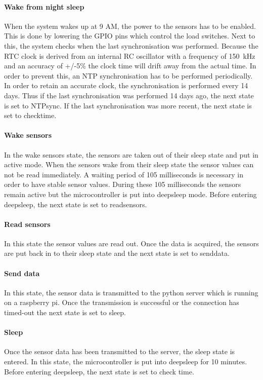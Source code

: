 \documentclass[11pt,a4paper]{article}
\begin{document}
\paragraph{Wake from night sleep}
When the system wakes up at 9 AM, the power to the sensors has to be enabled. This is done by lowering the GPIO pins which control the load switches. Next to this, the system checks when the last synchronisation was performed. Because the RTC clock is derived from an internal RC oscillator with a frequency of \SI{150}{\kilo\hertz} and an accuracy of +/-5\% the clock time will drift away from the actual time. In order to prevent this, an NTP synchronisation has to be performed periodically. In order to retain an accurate clock, the synchronisation is performed every 14 days. Thus if the last synchronisation was performed 14 days ago, the next state is set to NTPsync. If the last synchronisation was more recent, the next state is set to checktime. 

\paragraph{Wake sensors}
In the wake sensors state, the sensors are taken out of their sleep state and put in active mode. When the sensors wake from their sleep state the sensor values can not be read immediately. A waiting period of 105 milliseconds is necessary in order to have stable sensor values. During these 105 milliseconds the sensors remain active but the microcontroller is put into deepsleep mode. Before entering deepsleep, the next state is set to readsensors. 

\paragraph{Read sensors}
In this state the sensor values are read out. Once the data is acquired, the sensors are put back in to their sleep state and the next state is set to senddata.

\paragraph{Send data}
In this state, the sensor data is transmitted to the python server which is running on a raspberry pi. Once the transmission is successful or the connection has timed-out the next state is set to sleep.

\paragraph{Sleep}
Once the sensor data has been transmitted to the server, the sleep state is entered. In this state, the microcontroller is put into deepsleep for 10 minutes. Before entering deepsleep, the next state is set to check time.
\end{document}
